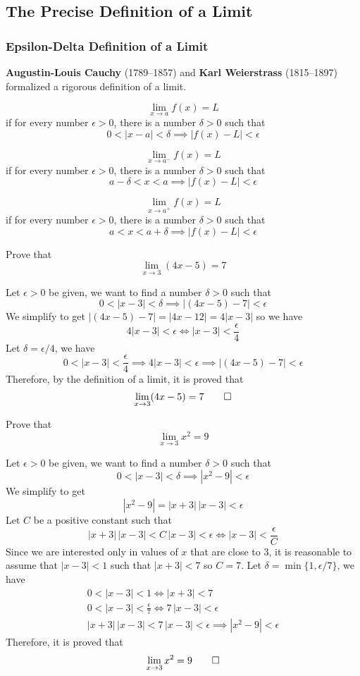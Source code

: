 \subsection{The Precise Definition of a Limit}

\subsubsection{Epsilon-Delta Definition of a Limit}
\textbf{Augustin-Louis Cauchy} (1789--1857) and \textbf{Karl Weierstrass}
(1815--1897) formalized a rigorous definition of a limit.
\begin{definition}
    \[\lim_{x\to a}f(x)=L\] if for every number \(\epsilon>0\), there is a
    number \(\delta>0\) such that \[0<|x-a|<\delta\implies|f(x)-L|<\epsilon\]
\end{definition}
\begin{definition}
    \[\lim_{x\to a^-}f(x)=L\] if for every number \(\epsilon>0\), there is a
    number \(\delta>0\) such that \[a-\delta<x<a\implies|f(x)-L|<\epsilon\]
\end{definition}
\begin{definition}
    \[\lim_{x\to a^+}f(x)=L\] if for every number \(\epsilon>0\), there is a
    number \(\delta>0\) such that \[a<x<a+\delta\implies|f(x)-L|<\epsilon\]
\end{definition}
\begin{problem}
    Prove that \[\lim_{x\to 3}(4x-5)=7\]
\end{problem}
\begin{solution}
    Let \(\epsilon>0\) be given, we want to find a number \(\delta>0\) such
    that \[0<|x-3|<\delta \implies|(4x-5)-7|<\epsilon\]
    We simplify to get \(|(4x-5)-7|=|4x-12|=4|x-3|\) so we have
    \[4|x-3|<\epsilon\iff|x-3|<\frac{\epsilon}{4}\]
    Let \(\delta=\epsilon/4\), we have
    \[0<|x-3|<\frac{\epsilon}{4}\implies4|x-3|<\epsilon\implies
    |(4x-5)-7|<\epsilon\]
    Therefore, by the definition of a limit, it is proved that
    \[\lim_{x\to 3}(4x-5)=7\qedhere\]
\end{solution}
\begin{problem}
    Prove that \[\lim_{x\to 3}x^2=9\]
\end{problem}
\begin{solution}
    Let \(\epsilon>0\) be given, we want to find a number \(\delta>0\) such
    that \[0<|x-3|<\delta\implies|x^2-9|<\epsilon\]
    We simplify to get \[|x^2-9|=|x+3|\,|x-3|<\epsilon\]
    Let \(C\) be a positive constant such that
    \[|x+3|\,|x-3|<C\,|x-3|<\epsilon \iff |x-3|<\frac{\epsilon}{C}\]
    Since we are interested only in values of \(x\) that are close to 3, it is
    reasonable to assume that \(|x-3|<1\) such that \(|x+3|<7\) so \(C=7\).
    Let \(\delta=\min\{1,\epsilon/7\}\), we have
    \begin{gather*}
        0<|x-3|<1\iff|x+3|<7 \\ 0<|x-3|<\frac{\epsilon}{7}\iff
        7\,|x-3|<\epsilon \\ |x+3|\,|x-3|<7\,|x-3|<\epsilon\implies
        |x^2-9|<\epsilon
    \end{gather*}
    Therefore, it is proved that \[\lim_{x\to 3}x^2=9\qedhere\]
\end{solution}
